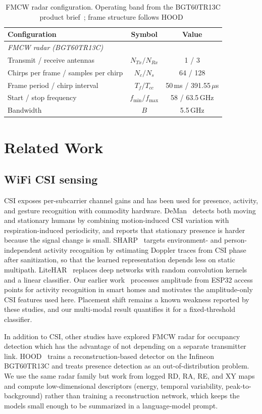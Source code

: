 \documentclass[conference,10pt,letterpaper]{IEEEtran}
\begin{document}
\begin{table}[!b]
\centering\footnotesize
\setlength{\tabcolsep}{3.5pt}
\caption{FMCW radar configuration. Operating band from the BGT60TR13C product brief~\cite{bgt60}; frame structure follows HOOD~\cite{hood}}
\label{tab:radar}
\begin{tabular}{lcc}\toprule
Configuration & Symbol & Value\\\midrule
\multicolumn{3}{l}{\itshape FMCW radar (BGT60TR13C)}\\
Transmit / receive antennas & $N_{Tx}/N_{Rx}$ & 1 / 3\\
Chirps per frame / samples per chirp & $N_c/N_s$ & 64 / 128\\
Frame period / chirp interval & $T_f/T_{cc}$ & 50\,ms / 391.55\,$\mu$s\\
Start / stop frequency & $f_{\min}/f_{\max}$ & 58 / 63.5\,GHz\\
Bandwidth & $B$ & 5.5\,GHz\\\bottomrule
\end{tabular}
\end{table}

\section{Related Work}\label{sec:related}
\subsection{WiFi CSI sensing}
CSI exposes per-subcarrier channel gains and has been used for presence, activity, and gesture recognition with commodity hardware. DeMan~\cite{deman} detects both moving and stationary humans by combining motion-induced CSI variation with respiration-induced periodicity, and reports that stationary presence is harder because the signal change is small. SHARP~\cite{sharp} targets environment- and person-independent activity recognition by estimating Doppler traces from CSI phase after sanitization, so that the learned representation depends less on static multipath. LiteHAR~\cite{litehar} replaces deep networks with random convolution kernels and a linear classifier. Our earlier work~\cite{wifi} processes amplitude from ESP32 access points for activity recognition in smart homes and motivates the amplitude-only CSI features used here. Placement shift remains a known weakness reported by these studies, and our multi-modal result quantifies it for a fixed-threshold classifier.

In addition to CSI, other studies have explored FMCW radar for occupancy detection which has the advantage of not depending on a separate transmitter link. HOOD~\cite{hood} trains a reconstruction-based detector on the Infineon BGT60TR13C and treats presence detection as an out-of-distribution problem. 
We use the same radar family but work from logged RD, RA, RE, and XY maps and compute low-dimensional descriptors (energy, temporal variability, peak-to-background) rather than training a reconstruction network, which keeps the models small enough to be summarized in a language-model prompt.
\end{document}
